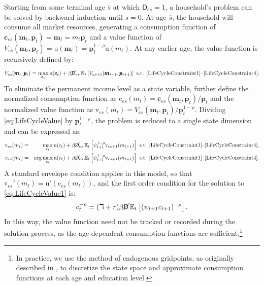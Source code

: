 \documentclass{econtex}\usepackage[pdftex]{graphicx}\usepackage{epstopdf} \usepackage[pdftex]{hyperref}
\newcommand{\cFunc}{\ensuremath{\mathrm{c}}}
\newcommand{\cLev}{\ensuremath{\pmb{c}}}
\newcommand{\cRat}{\ensuremath{c}}
\newcommand{\CRRA}{\ensuremath{\rho}}
\newcommand{\Discount}{\ensuremath{\beta}}
\newcommand{\mLev}{\ensuremath{\pmb{m}}}
\newcommand{\mRat}{\ensuremath{m}}
\newcommand{\PDies}{\ensuremath{\mathsf{D}}}
\newcommand{\pLev}{\ensuremath{\pmb{p}}}
\newcommand{\PLives}{\ensuremath{\cancel{\PDies}}}
\newcommand{\pshk}{\psi} %
\newcommand{\rProd}{\ensuremath{\mathit{r}}}
\newcommand{\util}{{\ensuremath{\mathrm{u}}}}
\newcommand{\vFunc}{\ensuremath{\mathrm{v}}}
\begin{document}
Starting from some terminal age $\overline{s}$ at which $\PDies_{e\overline{s}} = 1$, a household's problem can be solved by backward induction until $s = 0$.  At age $\overline{s}$, the household will consume all market resources, generating a consumption function of $\cLev_{e\overline{s}}(\mLev_t,\pLev_t) = \mLev_t = \mRat_t \pLev_t$ and a value function of $V_{e\overline{s}}(\mLev_t,\pLev_t) = \util(\mLev_t) = \pLev_t^{1-\CRRA} \util(\mRat_t)$.  At any earlier age, the value function is recursively defined by:
\begin{equation}
\label{eq:LifeCycleValue}
V_{es}(\mLev_t,\pLev_t) = \max_{\cLev_t} \util(\cLev_t) + \Discount \PLives_{es} \Ex_t \left[ V_{es+1}(\mLev_{t+1},\pLev_{t+1})\right] \text{ s.t. \eqref{LifeCycleConstraint1}--\eqref{LifeCycleConstraint4}}.
\end{equation}
To eliminate the permanent income level as a state variable, further define the normalized consumption function as $\cFunc_{es}(\mRat_t) = \cLev_{es}(\mLev_t,\pLev_t)/\pLev_t$ and the normalized value function as $\vFunc_{es}(\mRat_t) = V_{es}(\mLev_t,\pLev_t)/\pLev_t^{1-\CRRA}$.  Dividing \eqref{eq:LifeCycleValue} by $\pLev_t^{1-\CRRA}$, the problem is reduced to a single state dimension and can be expressed as:
\begin{eqnarray}\label{eq:LifeCycleValue1}
\vFunc_{es}(\mRat_t) &=& \max_{\cRat_t} \util(\cRat_t) + \Discount \PLives_{es} \Ex_t \left[\pshk_{t+1}^{1-\CRRA} \vFunc_{es+1}(\mRat_{t+1})\right] \text{ s.t. \eqref{LifeCycleConstraint1}--\eqref{LifeCycleConstraint4}},\\
\cFunc_{es}(\mRat_t) &=& \arg\max_{\cRat_t} \util(\cRat_t) + \Discount \PLives_{es} \Ex_t \left[\pshk_{t+1}^{1-\CRRA} \vFunc_{es+1}(\mRat_{t+1})\right] \text{ s.t. \eqref{LifeCycleConstraint1}--\eqref{LifeCycleConstraint4}}. \nonumber
\end{eqnarray}
A standard envelope condition applies in this model, so that $\vFunc_{es}'(\mRat_t) = \util'(\cFunc_{es}(\mRat_t))$, and the first order condition for the solution to \eqref{eq:LifeCycleValue1} is:
\begin{equation}
\cRat_t^{-\CRRA} = (\daleth +\rProd) \Discount \PLives \Ex_t \left[ (\pshk_{t+1} \cRat_{t+1})^{-\CRRA} \right].
\end{equation}
In this way, the value function need not be tracked or recorded during the solution process, as the age-dependent consumption functions are sufficient.\footnote{In practice, we use the method of endogenous gridpoints, as originally described in \cite{EndogenousGridpoints}, to discretize the state space and approximate consumption functions at each age and education level.}
\end{document}
